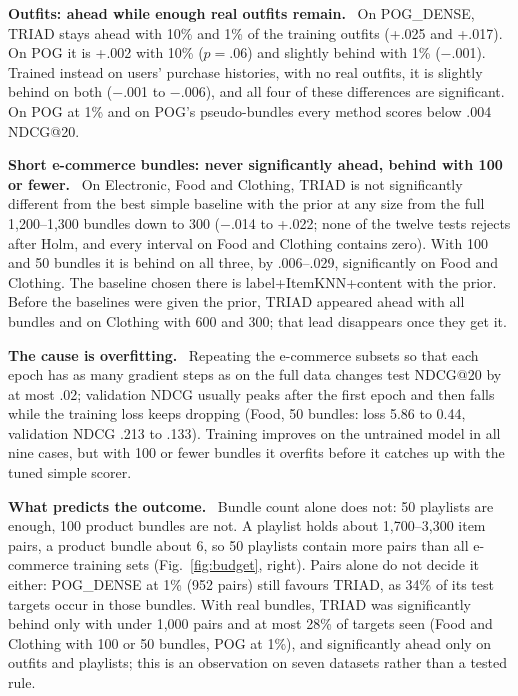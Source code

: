 \documentclass[runningheads]{llncs}
\renewcommand{\paragraph}[1]{\smallskip\noindent\textbf{#1}\ }
\begin{document}
\paragraph{Outfits: ahead while enough real outfits remain.} On POG\_DENSE, TRIAD stays ahead with 10\% and 1\%
of the training outfits (+.025 and +.017). On POG it is +.002 with 10\% ($p=.06$) and slightly behind with 1\%
($-$.001). Trained instead on users' purchase histories, with no real outfits, it is slightly behind on both
($-$.001 to $-$.006), and all four of these differences are significant. On POG at 1\% and on POG's pseudo-bundles every
method scores below .004 NDCG@20.

\paragraph{Short e-commerce bundles: never significantly ahead, behind with 100 or fewer.} On Electronic, Food and
Clothing, TRIAD is not significantly different from the best simple baseline with the prior at any size from the full
1,200--1,300 bundles down to 300 ($-$.014 to +.022; none of the twelve tests rejects after Holm, and every interval on
Food and Clothing contains zero). With 100 and 50 bundles it is behind on all three, by .006--.029, significantly on Food and Clothing.
The baseline chosen there is label+ItemKNN+content with the prior. Before the baselines were given the prior, TRIAD
appeared ahead with all bundles and on Clothing with 600 and 300; that lead disappears once they get it.

\paragraph{The cause is overfitting.} Repeating the e-commerce subsets so that each epoch has as many gradient steps
as on the full data changes test NDCG@20 by at most .02; validation NDCG usually peaks after the first epoch and then
falls while the training loss keeps dropping (Food, 50 bundles: loss 5.86 to 0.44, validation NDCG .213 to .133).
Training improves on the untrained model in all nine cases, but with 100 or fewer bundles it overfits before it
catches up with the tuned simple scorer.

\paragraph{What predicts the outcome.} Bundle count alone does not: 50 playlists are enough, 100 product bundles are
not. A playlist holds about 1,700--3,300 item pairs, a product bundle about 6, so 50 playlists contain more pairs than
all e-commerce training sets (Fig.~\ref{fig:budget}, right). Pairs alone do not decide it either: POG\_DENSE at 1\%
(952 pairs) still favours TRIAD, as 34\% of its test targets occur in those bundles. With real bundles, TRIAD was
significantly behind only with under 1,000 pairs and at most 28\% of targets seen (Food and Clothing with 100 or 50
bundles, POG at 1\%), and significantly ahead only on outfits and playlists; this is an observation on seven datasets
rather than a tested rule.
\end{document}
